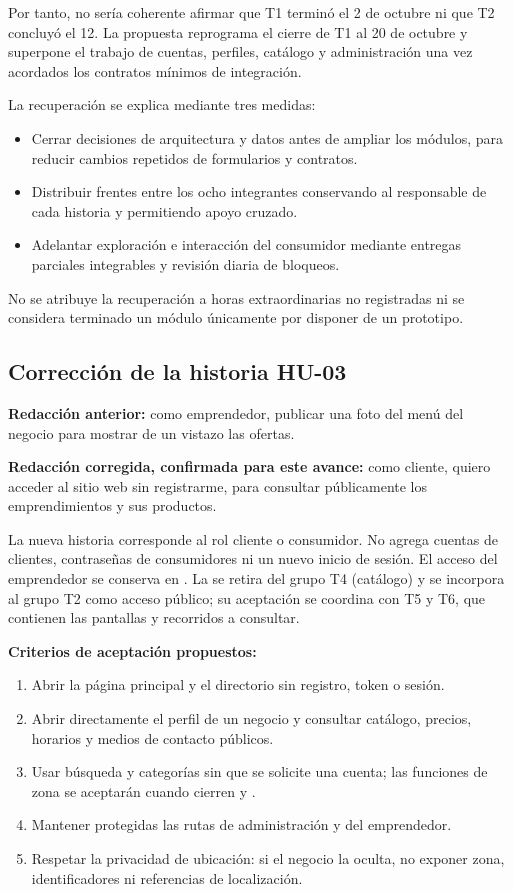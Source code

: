 Por tanto, no sería coherente afirmar que T1 terminó el 2 de octubre ni que
T2 concluyó el 12. La propuesta reprograma el cierre de T1 al 20 de octubre y
superpone el trabajo de cuentas, perfiles, catálogo y administración una vez
acordados los contratos mínimos de integración.

La recuperación se explica mediante tres medidas:
\begin{itemize}
\item Cerrar decisiones de arquitectura y datos antes de ampliar los módulos,
para reducir cambios repetidos de formularios y contratos.
\item Distribuir frentes entre los ocho integrantes conservando al responsable
de cada historia y permitiendo apoyo cruzado.
\item Adelantar exploración e interacción del consumidor mediante entregas
parciales integrables y revisión diaria de bloqueos.
\end{itemize}
No se atribuye la recuperación a horas extraordinarias no registradas ni se
considera terminado un módulo únicamente por disponer de un prototipo.

\subsection{Corrección de la historia HU-03}
\textbf{Redacción anterior:} como emprendedor, publicar una foto del menú del
negocio para mostrar de un vistazo las ofertas.

\textbf{Redacción corregida, confirmada para este avance:} como cliente,
quiero acceder al sitio web sin registrarme, para consultar públicamente los
emprendimientos y sus productos.

La nueva historia corresponde al rol cliente o consumidor. No agrega cuentas
de clientes, contraseñas de consumidores ni un nuevo inicio de sesión.
El acceso del emprendedor se conserva en . La  se retira del
grupo T4 (catálogo) y se incorpora al grupo T2 como acceso público; su
aceptación se coordina con T5 y T6, que contienen las pantallas y recorridos
a consultar.

\textbf{Criterios de aceptación propuestos:}
\begin{enumerate}[nosep,leftmargin=*]
\item Abrir la página principal y el directorio sin registro, token o sesión.
\item Abrir directamente el perfil de un negocio y consultar catálogo,
precios, horarios y medios de contacto públicos.
\item Usar búsqueda y categorías sin que se solicite una cuenta; las
funciones de zona se aceptarán cuando cierren  y .
\item Mantener protegidas las rutas de administración y del emprendedor.
\item Respetar la privacidad de ubicación: si el negocio la oculta, no
exponer zona, identificadores ni referencias de localización.
\end{enumerate}

